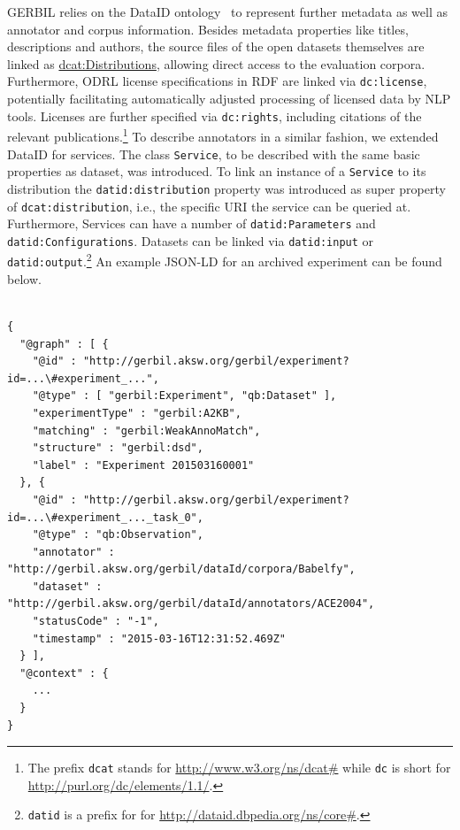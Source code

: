 GERBIL relies on the DataID ontology~\cite{dataID} to represent further metadata as well as annotator and corpus information. 
Besides metadata properties like titles, descriptions and authors, the source files of the open datasets themselves are linked as \url{dcat:Distributions}, allowing direct access to the evaluation corpora. 
Furthermore, ODRL license specifications in RDF are linked via \texttt{dc:license}, potentially facilitating automatically adjusted processing of licensed data by NLP tools. 
Licenses are further specified via \texttt{dc:rights}, including citations of the relevant publications.\footnote{The prefix \texttt{dcat} stands for \url{http://www.w3.org/ns/dcat\#} while \texttt{dc} is short for \url{http://purl.org/dc/elements/1.1/}.}
To describe annotators in a similar fashion, we extended DataID for services. 
The class \texttt{Service}, to be described with the same basic properties as dataset, was introduced. 
To link an instance of a \texttt{Service} to its distribution the \texttt{datid:distribution} property was introduced as super property of \texttt{dcat:distribution}, i.e., the specific URI the service can be queried at.
Furthermore, Services can have a number of \texttt{datid:Parameters} and \texttt{datid:Configurations}.
Datasets can be linked via \texttt{datid:input} or \texttt{datid:output}.\footnote{\texttt{datid} is a prefix for for \url{http://dataid.dbpedia.org/ns/core\#}.} 
An example JSON-LD for an archived experiment can be found below.


\scriptsize
\begin{verbatim}

{
  "@graph" : [ {
    "@id" : "http://gerbil.aksw.org/gerbil/experiment?id=...\#experiment_...",
    "@type" : [ "gerbil:Experiment", "qb:Dataset" ],
    "experimentType" : "gerbil:A2KB",
    "matching" : "gerbil:WeakAnnoMatch",
    "structure" : "gerbil:dsd",
    "label" : "Experiment 201503160001"
  }, {
    "@id" : "http://gerbil.aksw.org/gerbil/experiment?id=...\#experiment_..._task_0",
    "@type" : "qb:Observation",
    "annotator" : "http://gerbil.aksw.org/gerbil/dataId/corpora/Babelfy",
    "dataset" : "http://gerbil.aksw.org/gerbil/dataId/annotators/ACE2004",
    "statusCode" : "-1",
    "timestamp" : "2015-03-16T12:31:52.469Z"
  } ],
  "@context" : {
    ...
  }
}
\end{verbatim}
\normalsize

